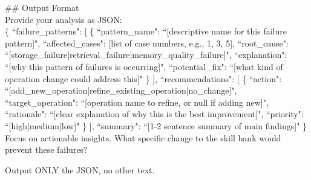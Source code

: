 \begin{center}
\begin{tcolorbox}[title={Designer Analysis Prompt}]
{\#\# Output Format \\
Provide your analysis as JSON: \\
\{
    ``failure\_patterns": [
        \{
            ``pattern\_name": ``[descriptive name for this failure pattern]",
            ``affected\_cases": [list of case numbers, e.g., 1, 3, 5],
            ``root\_cause": ``[storage\_failure|retrieval\_failure|memory\_quality\_failure]",
            ``explanation": ``[why this pattern of failures is occurring]",
            ``potential\_fix": ``[what kind of operation change could address this]"
        \}
    ],
    ``recommendations": [
        \{
            ``action": ``[add\_new\_operation|refine\_existing\_operation|no\_change]",
            ``target\_operation": ``[operation name to refine, or null if adding new]",
            ``rationale": ``[clear explanation of why this is the best improvement]",
            ``priority": ``[high|medium|low]"
        \}
    ],
    ``summary": ``[1-2 sentence summary of main findings]"
\} \\

Focus on actionable insights. What specific change to the skill bank would prevent these failures?

Output ONLY the JSON, no other text.
}
\label{appendix:case_designer_1}
\end{tcolorbox}
\end{center}




